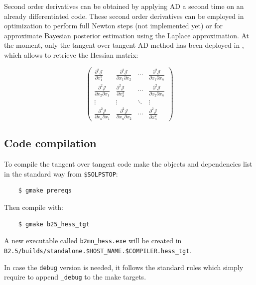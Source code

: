 Second order derivatives can be obtained by applying AD a second time on an already differentiated code. These second order derivatives can be employed in optimization to perform full Newton steps (not implemented yet) or for approximate Bayesian posterior estimation using the Laplace approximation. At the moment, only the tangent over tangent AD method has been deployed in \SOLPSITER, which allows to retrieve the Hessian matrix:

\begin{equation}\label{hess}
	\begin{pmatrix}
		\frac{\partial^2 \mathcal{J}}{\partial x_1^2} & \frac{\partial^2 \mathcal{J}}{\partial x_1 \partial x_2} & \cdots & \frac{\partial^2 \mathcal{J}}{\partial x_1 \partial x_n} \\
		
		\frac{\partial^2 \mathcal{J}}{\partial x_2 \partial x_1} & \frac{\partial^2 \mathcal{J}}{\partial x_2^2} & \cdots & \frac{\partial^2 \mathcal{J}}{\partial x_2 \partial x_n} \\
		
		\vdots & \vdots & \ddots & \vdots \\
		
		\frac{\partial^2 \mathcal{J}}{\partial x_n \partial x_1} & \frac{\partial^2 \mathcal{J}}{\partial x_n \partial x_2 } & \cdots & \frac{\partial^2 \mathcal{J}}{\partial x_n^2}
	\end{pmatrix}
\end{equation}

\subsection{Code compilation}

To compile the tangent over tangent code make the objects and dependencies list in the standard way from {\tt \$SOLPSTOP}:
\begin{verbatim}
	$ gmake prereqs
\end{verbatim}
Then compile with:
\begin{verbatim}
	$ gmake b25_hess_tgt
\end{verbatim}

A new executable called {\tt b2mn\_hess.exe} will be created in {\tt B2.5/builds/standalone.\allowbreak\${HOST\_NAME}.\allowbreak\${COMPILER}.hess\_tgt}.

In case the {\tt debug} version is needed, it follows the standard \SOLPSITER rules which simply require to append {\tt \_debug} to the make targets.

